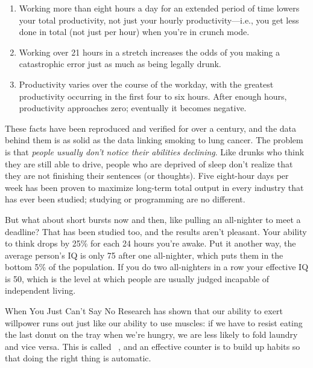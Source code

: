 \begin{enumerate}

\item
  Working more than eight hours a day for an extended period of time
  lowers your total productivity,
  not just your hourly productivity---i.e.,
  you get less done in total (not just per hour)
  when you're in crunch mode.

\item
  Working over 21 hours in a stretch increases the odds of you making a catastrophic error
  just as much as being legally drunk.

\item
  Productivity varies over the course of the workday,
  with the greatest productivity occurring in the first four to six hours.
  After enough hours,
  productivity approaches zero;
  eventually it becomes negative.

\end{enumerate}

These facts have been reproduced and verified for over a century,
and the data behind them is as solid as the data linking smoking to lung cancer.
The problem is that
\emph{people usually don't notice their abilities declining}.
Like drunks who think they are still able to drive,
people who are deprived of sleep don't realize that
they are not finishing their sentences (or thoughts).
Five eight-hour days per week has been proven to maximize long-term total output
in every industry that has ever been studied;
studying or programming are no different.

But what about short bursts now and then,
like pulling an all-nighter to meet a deadline?
That has been studied too,
and the results aren't pleasant.
Your ability to think drops by 25\% for each 24 hours you're awake.
Put it another way,
the average person's IQ is only 75 after one all-nighter,
which puts them in the bottom 5\% of the population.
If you do two all-nighters in a row your effective IQ is 50,
which is the level at which people are usually judged incapable of independent living.

\begin{aside}{When You Just Can't Say No}
  Research has shown that our ability to exert willpower runs out
  just like our ability to use muscles:
  if we have to resist eating the last donut on the tray when we're hungry,
  we are less likely to fold laundry and vice versa.
  This is called ~\cite{Mill2016a},
  and an effective counter is to build up habits
  so that doing the right thing is automatic.
\end{aside}

